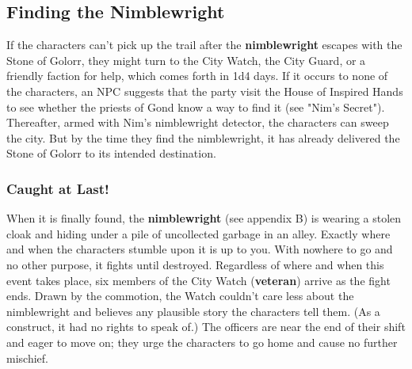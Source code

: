 \documentclass[10pt,a4paper,twoside,twocolumn,openany,nodeprecatedcode]{dndbook}
\begin{document}
\subsection{Finding the Nimblewright}
If the characters can't pick up the trail after the \textbf{nimblewright} escapes with the Stone of Golorr, they might turn to the City Watch, the City Guard, or a friendly faction for help, which comes forth in 1d4 days. If it occurs to none of the characters, an NPC suggests that the party visit the House of Inspired Hands to see whether the priests of Gond know a way to find it (see "Nim's Secret"). Thereafter, armed with Nim's nimblewright detector, the characters can sweep the city. But by the time they find the nimblewright, it has already delivered the Stone of Golorr to its intended destination.
\subsubsection{Caught at Last!}
When it is finally found, the \textbf{nimblewright} (see appendix B) is wearing a stolen cloak and hiding under a pile of uncollected garbage in an alley. Exactly where and when the characters stumble upon it is up to you. With nowhere to go and no other purpose, it fights until destroyed. Regardless of where and when this event takes place, six members of the City Watch (\textbf{veteran}) arrive as the fight ends. Drawn by the commotion, the Watch couldn't care less about the nimblewright and believes any plausible story the characters tell them. (As a construct, it had no rights to speak of.) The officers are near the end of their shift and eager to move on; they urge the characters to go home and cause no further mischief.
\end{document}

